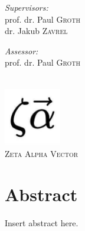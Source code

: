 \documentclass[12pt]{extreport}
\begin{document}
\begin{titlepage}
\noindent
\begin{minipage}[t]{0.4\textwidth}
\begin{flushleft} \large
\emph{Supervisors:} \\
prof. dr. Paul \textsc{Groth}\\
dr. Jakub \textsc{Zavrel}
\end{flushleft}
\end{minipage}
\begin{minipage}[t]{0.4\textwidth}
\begin{flushright} \large
\emph{Assessor:} \\
prof. dr. Paul \textsc{Groth}\\
\end{flushright}
\end{minipage}\\[2cm]


\includegraphics[width=2.5cm]{assets/logos/zeta-alpha-logo.jpg}\\ %
\textsc{\large Zeta Alpha Vector}\\[1.0cm] %
 

\vfill %

\end{titlepage}

\chapter*{Abstract}

Insert abstract here.
\end{document}

